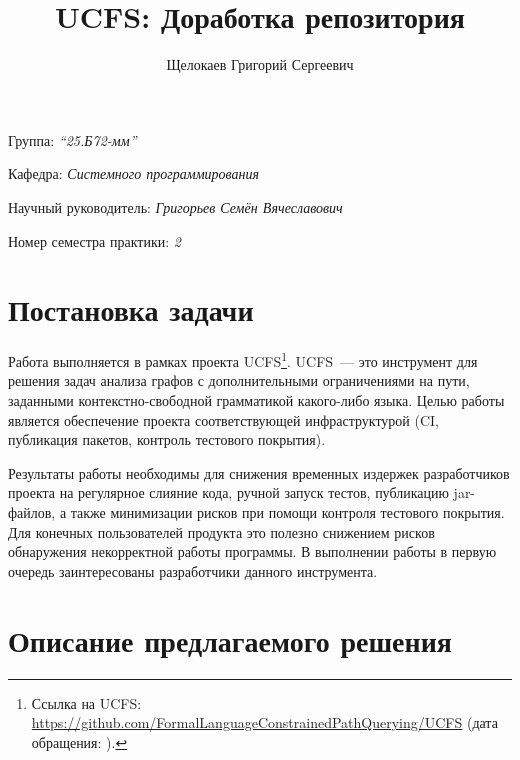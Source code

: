 \documentclass[a4paper]{article}
\title{UCFS: Доработка репозитория}
\author{Щелокаев Григорий Сергеевич}
\date{}
\begin{document}
\maketitle

\begin{flushright}
    Группа: \emph{\enquote{25.Б72-мм}}

    Кафедра: \emph{Системного программирования}

    Научный руководитель: \emph{Григорьев Семён Вячеславович}

    Номер семестра практики: \emph{2}
\end{flushright} 


\section{Постановка задачи}

Работа выполняется в рамках проекта UCFS\footnote{Ссылка на UCFS: \url{https://github.com/FormalLanguageConstrainedPathQuerying/UCFS} (дата обращения: ).}. UCFS~--- это инструмент для решения задач анализа графов с дополнительными ограничениями на пути, заданными контекстно-свободной грамматикой какого-либо языка. Целью работы является обеспечение проекта соответствующей инфраструктурой (CI, публикация пакетов, контроль тестового покрытия).

Результаты работы необходимы для снижения временных издержек разработчиков проекта на регулярное слияние кода, ручной запуск тестов, публикацию jar-файлов, а также минимизации рисков при помощи контроля тестового покрытия. Для конечных пользователей продукта это полезно снижением рисков обнаружения некорректной работы программы. В выполнении работы в первую очередь заинтересованы разработчики данного инструмента.
\section{Описание предлагаемого решения}
\end{document}
